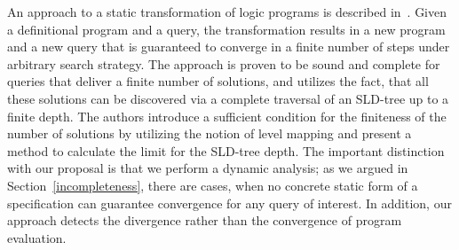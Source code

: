 An approach to a static transformation of logic programs is described in~\cite{BoundedNondeterminism}. Given a definitional program and
a query, the transformation results in a new program and a new query that is guaranteed to converge in a finite number of steps
under arbitrary search strategy. The approach is proven to be sound and complete for queries that deliver a finite number of solutions,
and utilizes the fact, that all these solutions can be discovered via a complete traversal of an SLD-tree up to a finite depth. The
authors introduce a sufficient condition for the finiteness of the number of solutions by utilizing the notion of level mapping and
present a method to calculate the limit for the SLD-tree depth. The important distinction with our proposal is that we perform a
dynamic analysis; as we argued in Section~\ref{incompleteness}, there are cases, when no concrete static form of a specification can
guarantee convergence for any query of interest. In addition, our approach detects the divergence rather than the
convergence of program evaluation.
